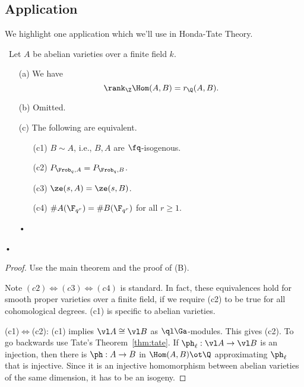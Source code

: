 \subsection{Application}
We highlight one application which we'll use in Honda-Tate Theory.
\begin{thm}[Tate, \S3]$\,$
Let $A$ be abelian varieties over a finite field $k$.
\begin{enumerate}
\item[(a)]
We have
\[
\rank_{\Z}\Hom(A,B)=r_{\Q}(A,B).
\]
\item[(b)]
Omitted.
\item[(c)]
The following are equivalent. 
\begin{enumerate}
\item[(c1)]
$B\sim A$, i.e., $B, A$ are $\fq$-isogenous.
\item[(c2)]
$P_{\Frob_q,A}=P_{\Frob_q,B}$.
\item[(c3)]
$\ze(s,A)=\ze(s,B)$.
\item[(c4)]
$\#A(\F_{q^r})=\#B(\F_{q^r})$ for all $r\ge 1$.
\end{enumerate}•
\end{enumerate}•
\end{thm}
\begin{proof}
Use the main theorem and the proof of (B).

Note $(c2)\iff (c3)\iff (c4)$ is standard. In fact, these equivalences hold for
smooth proper varieties over a finite field, if we require (c2) to be true for all cohomological degrees. %
(c1) is specific to abelian varieties. 

(c1)$\iff$(c2): (c1) implies $\vl A\cong \vl B$ as $\ql\Ga$-modules. This gives (c2). To go backwards use Tate's Theorem~\ref{thm:tate}. If $\ph_{\ell}:\vl A\to \vl B$ is an injection, then there is $\ph:A\to B$ in $\Hom(A,B)\ot \Q$ approximating $\ph_{\ell}$ that is injective. %
Since it is an injective homomorphism between abelian varieties of the same dimension, it has to be an isogeny.
\end{proof}